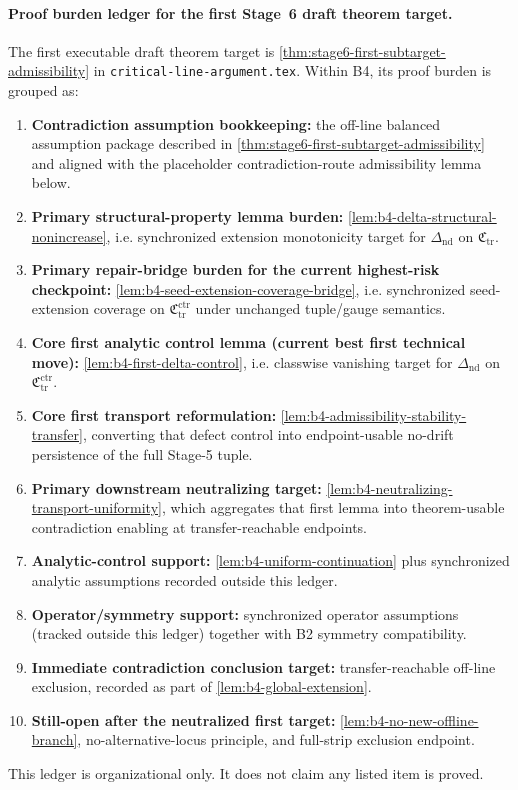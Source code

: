 \paragraph{Proof burden ledger for the first Stage~6 draft theorem target.}
The first executable draft theorem target is \cref{thm:stage6-first-subtarget-admissibility} in \texttt{critical-line-argument.tex}.
Within B4, its proof burden is grouped as:
\begin{enumerate}
  \item \textbf{Contradiction assumption bookkeeping:} the off-line balanced assumption package described in \cref{thm:stage6-first-subtarget-admissibility} and aligned with the placeholder contradiction-route admissibility lemma below.
  \item \textbf{Primary structural-property lemma burden:} \cref{lem:b4-delta-structural-nonincrease}, i.e. synchronized extension monotonicity target for $\Delta_{\mathrm{nd}}$ on $\mathfrak{C}_{\mathrm{tr}}$.
  \item \textbf{Primary repair-bridge burden for the current highest-risk checkpoint:} \cref{lem:b4-seed-extension-coverage-bridge}, i.e. synchronized seed-extension coverage on $\mathfrak{C}_{\mathrm{tr}}^{\mathrm{ctr}}$ under unchanged tuple/gauge semantics.
  \item \textbf{Core first analytic control lemma (current best first technical move):} \cref{lem:b4-first-delta-control}, i.e. classwise vanishing target for $\Delta_{\mathrm{nd}}$ on $\mathfrak{C}_{\mathrm{tr}}^{\mathrm{ctr}}$.
  \item \textbf{Core first transport reformulation:} \cref{lem:b4-admissibility-stability-transfer}, converting that defect control into endpoint-usable no-drift persistence of the full Stage-5 tuple.
  \item \textbf{Primary downstream neutralizing target:} \cref{lem:b4-neutralizing-transport-uniformity}, which aggregates that first lemma into theorem-usable contradiction enabling at transfer-reachable endpoints.
  \item \textbf{Analytic-control support:} \cref{lem:b4-uniform-continuation} plus synchronized analytic assumptions recorded outside this ledger.
  \item \textbf{Operator/symmetry support:} synchronized operator assumptions (tracked outside this ledger) together with B2 symmetry compatibility.
  \item \textbf{Immediate contradiction conclusion target:} transfer-reachable off-line exclusion, recorded as part of \cref{lem:b4-global-extension}.
  \item \textbf{Still-open after the neutralized first target:} \cref{lem:b4-no-new-offline-branch}, no-alternative-locus principle, and full-strip exclusion endpoint.
\end{enumerate}
This ledger is organizational only.
It does not claim any listed item is proved.

